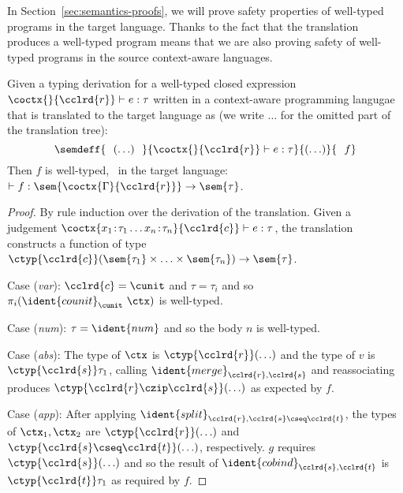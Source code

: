 In Section~\ref{sec:semantics-proofs}, we will prove safety properties of well-typed programs in
the target language. Thanks to the fact that the translation produces a well-typed program
means that we are also proving safety of well-typed programs in the source context-aware languages.

\begin{theorem}
\label{thm:semantics-welltyped}
Given a typing derivation for a well-typed closed expression $\coctx{}{\cclrd{r}} \vdash e : \tau$
written in a context-aware programming langugae that is translated to the target language as
(we write $\ldots$ for the omitted part of the translation tree):
%
\begin{equation*}
  \semdeff
    {~~(\ldots)~~}
    {\coctx{}{\cclrd{r}} \vdash e : \tau }
    {(\ldots)}
    { ~~f }
\end{equation*}
%
Then $f$ is well-typed, \ie~in the target language: $\vdash f : \sem{\coctx{\Gamma}{\cclrd{r}}} \rightarrow \sem{\tau}$.
\end{theorem}
\begin{proof}
By rule induction over the derivation of the translation. Given a judgement
$\coctx{x_1\!:\!\tau_1 \ldots x_n\!:\!\tau_n}{\cclrd{c}} \vdash e : \tau$, the translation
constructs a function of type $\ctyp{\cclrd{c}}(\sem{\tau_1} \times\ldots\times \sem{\tau_n}) \rightarrow \sem{\tau}$.

\vspace{0.5em}\noindent\hangindent=0.6cm
Case (\emph{var}): $\cclrd{c}=\cunit$ and $\tau = \tau_i$ and so $\pi_i ({\ident{counit}_\cunit}~\ctx)$ is well-typed.

\vspace{0.25em}\noindent\hangindent=0.6cm
Case (\emph{num}): $\tau = \ident{num}$ and so the body $n$ is well-typed.

\vspace{0.25em}\noindent\hangindent=0.6cm
Case (\emph{abs}): The type of $\ctx$ is $\ctyp{\cclrd{r}}(\ldots)$ and the type of $v$ is $\ctyp{\cclrd{s}}\tau_1$,
  calling $\ident{merge}_{\cclrd{r},\cclrd{s}}$ and reassociating produces
  $\ctyp{\cclrd{r}\czip\cclrd{s}}(\ldots)$ as expected by $f$.

\vspace{0.25em}\noindent\hangindent=0.6cm
Case (\emph{app}): After applying $\ident{split}_{\cclrd{r}, \cclrd{s}\cseq\cclrd{t}}$, the types of
  $\ctx_1, \ctx_2$ are $\ctyp{\cclrd{r}}(\ldots)$ and $\ctyp{\cclrd{s}\cseq\cclrd{t}}(\ldots)$, respectively.
  $g$ requires $\ctyp{\cclrd{s}}(\ldots)$ and so the result of $\ident{cobind}_{\cclrd{s},\cclrd{t}}$ is
  $\ctyp{\cclrd{t}}\tau_1$ as required by $f$.
\end{proof}



